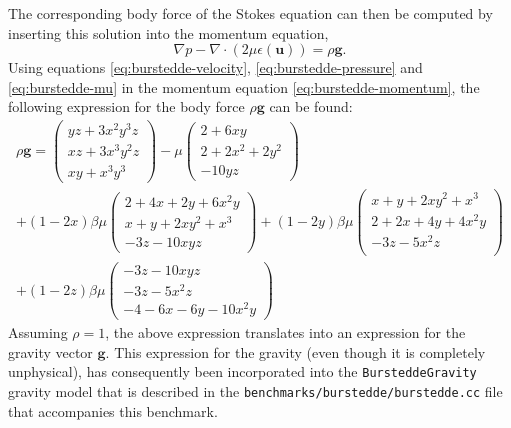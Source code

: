 \documentclass{article}
\begin{document}
The corresponding body force of the Stokes equation can then be computed by inserting this solution into the momentum equation,
\begin{equation}
  {\nabla} p - \nabla \cdot (2  \mu {\epsilon(\mathbf u)}) = \rho \mathbf g.
  \label{eq:burstedde-momentum}
\end{equation}
Using equations \eqref{eq:burstedde-velocity}, \eqref{eq:burstedde-pressure}
and \eqref{eq:burstedde-mu} in the
momentum equation \eqref{eq:burstedde-momentum}, the following expression for the body force
$\rho\mathbf g$ can be found:
\begin{multline}
  {\rho\mathbf g} 
  =
  \left(
    \begin{array}{c}
      yz+3x^2y^3z\\
      xz +3x^3y^2z \\
      xy+x^3y^3
    \end{array}
  \right)
  -\mu
  \left(
    \begin{array}{c}
      2+6xy  \\
      2 + 2x^2 +  2y^2 \\
      -10yz 
    \end{array}
  \right) \\
  +
  (1-2x)\beta \mu 
  \left(
    \begin{array}{c}
      2+4x+2y+6x^2y \\
      x+y+2xy^2+x^3 \\
      -3z -10xyz 
    \end{array}
  \right)
  +(1-2y)\beta \mu 
  \left(
    \begin{array}{c}
      x+y+2xy^2+x^3 \\
      2+2x+4y+4x^2y \\
      -3z-5x^2z \\
    \end{array}
  \right)
  \\
  +(1-2z)\beta \mu
  \left(
    \begin{array}{c}
      -3z -10xyz \\
      -3z-5x^2z \\
      -4-6x-6y-10x^2y
    \end{array}
  \right)
\end{multline}
Assuming $\rho = 1$, the above expression translates into an expression for the
gravity vector $\mathbf g$. This expression for the gravity (even though it is
completely unphysical), has consequently been incorporated into the
\texttt{BursteddeGravity} gravity model that is described in the
\texttt{benchmarks/burstedde/burstedde.cc} file that accompanies this benchmark.
\end{document}
